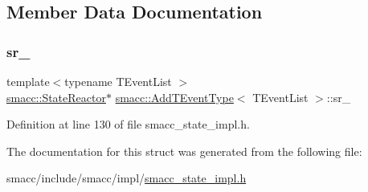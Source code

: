 \subsection{Member Data Documentation}
\mbox{\label{structsmacc_1_1AddTEventType_aba9d00c23aeaae6299708f031a9168ba}} 
\subsubsection{\texorpdfstring{sr\+\_\+}{sr\_}}
{\footnotesize\ttfamily template$<$typename T\+Event\+List $>$ \\
\hyperlink{classsmacc_1_1StateReactor}{smacc\+::\+State\+Reactor}$\ast$ \hyperlink{structsmacc_1_1AddTEventType}{smacc\+::\+Add\+T\+Event\+Type}$<$ T\+Event\+List $>$\+::sr\+\_\+}



Definition at line 130 of file smacc\+\_\+state\+\_\+impl.\+h.



The documentation for this struct was generated from the following file\+:\begin{DoxyCompactItemize}
\item 
smacc/include/smacc/impl/\hyperlink{smacc__state__impl_8h}{smacc\+\_\+state\+\_\+impl.\+h}\end{DoxyCompactItemize}
